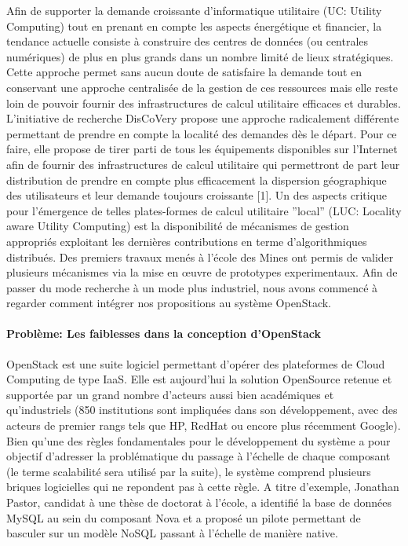 \documentclass[a4paper,11pt]{article}
\newcommand{\discovery}{DisCoVery }
\begin{document}
\begin{note}
 Afin de supporter la demande croissante d'informatique utilitaire (UC: Utility
 Computing) tout en prenant en compte les aspects énergétique et financier, la
 tendance actuelle consiste à construire des centres de données (ou centrales
 numériques) de plus en plus grands dans un nombre limité de lieux stratégiques.
 Cette approche permet sans aucun doute de satisfaire la demande tout en
 conservant une approche centralisée de la gestion de ces ressources mais elle
 reste loin de pouvoir fournir des infrastructures de calcul utilitaire
 efficaces et durables. L'initiative de recherche \discovery propose une
 approche radicalement différente permettant de prendre en compte la localité
 des demandes dès le départ. Pour ce faire, elle propose de tirer parti de tous
 les équipements disponibles sur l'Internet afin de fournir des infrastructures
 de calcul utilitaire qui permettront de part leur distribution de prendre en
 compte plus efficacement la dispersion géographique des utilisateurs et leur
 demande toujours croissante [1]. Un des aspects critique pour l'émergence de
 telles plates-formes de calcul utilitaire ''local'' (LUC: Locality aware
 Utility Computing) est la disponibilité de mécanismes de gestion appropriés
 exploitant les dernières contributions en terme d'algorithmiques distribués.
 Des premiers travaux menés à l'école des Mines ont permis de valider plusieurs
 mécanismes via la mise en \oe uvre de prototypes experimentaux. Afin de passer
 du mode recherche à un mode plus industriel, nous avons commencé à regarder
 comment intégrer nos propositions au système OpenStack.

\paragraph*{Problème: Les faiblesses dans la conception d'OpenStack\\}

  OpenStack est une suite logiciel permettant d'opérer des plateformes
  de Cloud Computing de type IaaS. Elle est aujourd'hui la solution
  OpenSource retenue et supportée par un grand nombre d'acteurs
  aussi bien académiques et qu'industriels (850 institutions sont
  impliquées dans son développement, avec des acteurs de premier rangs
  tels que HP, RedHat ou encore plus récemment Google).
  Bien qu'une des règles fondamentales pour le développement du
  système a pour objectif d'adresser la problématique du passage à
  l'échelle de chaque composant (le terme scalabilité sera utilisé par
  la suite), le système comprend plusieurs briques
  logicielles qui ne repondent pas à
  cette règle. A titre d'exemple, Jonathan Pastor, candidat à une thèse de doctorat à l'école,
  a identifié la base de données MySQL au
  sein du composant Nova et a proposé un pilote permettant de basculer sur
  un modèle NoSQL passant à l'échelle de manière native.



\end{note}
\end{document}
